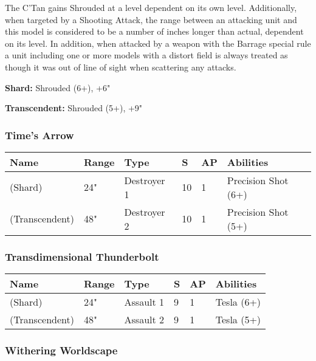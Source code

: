 The C'Tan gains Shrouded at a level dependent on its own level. Additionally, when targeted by a Shooting Attack, the range between an attacking unit and this model is considered to be a number of inches longer than actual, dependent on its level. In addition, when attacked by a weapon with the Barrage special rule a unit including one or more models with a distort field is always treated as though it was out of line of sight when scattering any attacks.

\textbf{Shard:} Shrouded (6+), +6"

\textbf{Transcendent:} Shrouded (5+), +9"

\subsubsection{Time's Arrow} \label{Time's Arrow}

\noindent
\begin{tabular}{||m{160pt} m{31pt} m{55pt} m{12pt} m{12pt} m{200pt}||}
	\hline
	Name & Range & Type & S & AP & Abilities \\
	\hline
	\quickref{Time's Arrow} (Shard) & 24" & Destroyer 1 & 10 & 1 & Precision Shot (6+) \\
	\quickref{Time's Arrow} (Transcendent) & 48" & Destroyer 2 & 10 & 1 & Precision Shot (5+) \\
	\hline
\end{tabular}

\subsubsection{Transdimensional Thunderbolt} \label{Transdimensional Thunderbolt}

\noindent
\begin{tabular}{||m{160pt} m{31pt} m{55pt} m{12pt} m{12pt} m{200pt}||}
	\hline
	Name & Range & Type & S & AP & Abilities \\
	\hline
	\quickref{Transdimensional Thunderbolt} (Shard) & 24" & Assault 1 & 9 & 1 & Tesla (6+) \\
	\quickref{Transdimensional Thunderbolt} (Transcendent) & 48" & Assault 2 & 9 & 1 & Tesla (5+) \\
	\hline
\end{tabular}


\subsubsection{Withering Worldscape} \label{Withering Worldscape}


